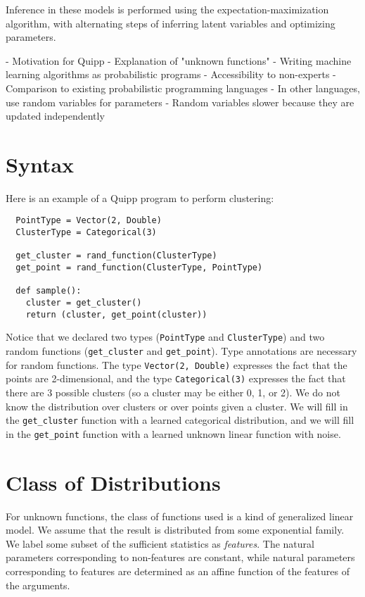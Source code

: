 \documentclass[proceed]{article}
\begin{document}
  Inference in these models is performed using the expectation-maximization
  algorithm, with alternating steps of inferring latent variables and optimizing
  parameters.


  - Motivation for Quipp
    - Explanation of "unknown functions"
    - Writing machine learning algorithms as probabilistic programs
    - Accessibility to non-experts
    - Comparison to existing probabilistic programming languages
      - In other languages, use random variables for parameters
      - Random variables slower because they are updated independently

  \section{Syntax}

  Here is an example of a Quipp program to perform clustering:


  \begin{verbatim}
  PointType = Vector(2, Double)
  ClusterType = Categorical(3)

  get_cluster = rand_function(ClusterType)
  get_point = rand_function(ClusterType, PointType)

  def sample():
    cluster = get_cluster()
    return (cluster, get_point(cluster))
  \end{verbatim}

  Notice that we declared two types (\texttt{PointType} and \texttt{ClusterType})
  and two random functions (\texttt{get\_cluster} and \texttt{get\_point}).
  Type annotations are necessary for random functions.  The type
  \texttt{Vector(2, Double)} expresses the fact that the points are 2-dimensional,
  and the type \texttt{Categorical(3)} expresses the fact that there are 3
  possible clusters (so a cluster may be either 0, 1, or 2).  We do not know
  the distribution over clusters or over points given a cluster.
  We will fill in the \texttt{get\_cluster} function with
  a learned categorical distribution, and we will fill in the
  \texttt{get\_point} function with a learned unknown linear function with noise.

  \section{Class of Distributions}

    For unknown functions, the class of functions used is a kind
    of generalized linear model.  We assume that the result
    is distributed from some exponential family.  We label
    some subset of the sufficient statistics as \emph{features}.  The natural
    parameters corresponding to non-features are constant, while natural
    parameters corresponding to features are determined as an affine
    function of the features of the arguments.
\end{document}
